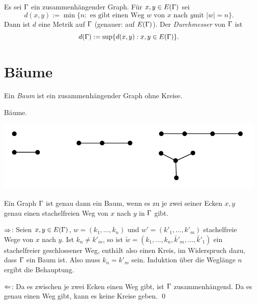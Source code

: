 \documentclass[a4paper, 12pt, twoside]{article}
\begin{document}
\DB Es sei $\Gamma$ ein zusammenhängender Graph. Für $x,y\in E(\Gamma)$ sei
\[
d(x,y) := \min\{ n : \text{ es gibt einen Weg $w$ von $x$ nach $y$
	mit $|w|=n$} \}.
\]
Dann ist $d$ eine Metrik auf $\Gamma$
(genauer: auf $E(\Gamma)$).
Der \emph{Durchmesser}
von $\Gamma$ ist
\[
d(\Gamma) := \sup\{ d(x,y) : x,y\in E(\Gamma)\}.
\]

\section{Bäume}\label{sec_baum}

\DEF Ein \emph{Baum} ist ein
zusammenhängender Graph ohne Kreise.

\BSP Bäume.
\begin{center}
	\includegraphics{grugraImages/bspbaum}
\end{center}

\PROP Ein Graph $\Gamma$ ist genau dann ein Baum, wenn es zu je zwei
seiner Ecken $x,y$ genau einen stachelfreien Weg von $x$ nach $y$ in
$\Gamma$ gibt.

\bew \glqq$\Rightarrow$\grqq: Seien $x,y\in E(\Gamma)$,
$w=(k_1,\ldots,k_n)$ und $w'=(k'_1,\ldots,k'_m)$ stachelfreie Wege
von $x$ nach $y$. Ist $k_n\neq k'_m$, so ist
$\tilde{w}=(k_1,\ldots,k_n,\bar{k}'_m,\ldots,\bar{k}'_1)$
ein stachelfreier geschlossener Weg, enthält also einen
Kreis, im Widerspruch dazu, dass $\Gamma$ ein Baum ist.
Also muss $k_n=k'_m$ sein. Induktion über die Weglänge $n$ ergibt
die Behauptung.

\glqq $\Leftarrow$\grqq: Da es zwischen je zwei Ecken einen Weg gibt, ist
$\Gamma$ zusammenhängend. Da es genau einen Weg gibt, kann es keine
Kreise geben.
\qed
\end{document}

